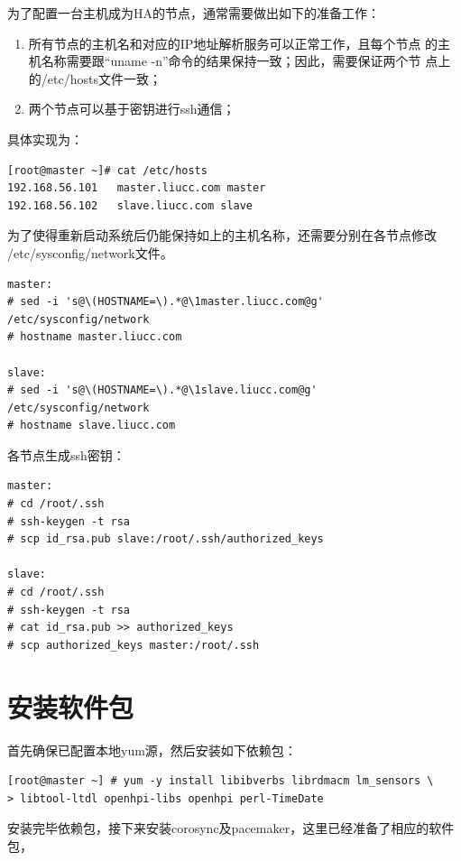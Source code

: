 为了配置一台主机成为HA的节点，通常需要做出如下的准备工作：
\begin{enumerate}[itemsep=0pt,parsep=0pt]
  \item 所有节点的主机名和对应的IP地址解析服务可以正常工作，且每个节点
    的主机名称需要跟“uname -n”命令的结果保持一致；因此，需要保证两个节
    点上的/etc/hosts文件一致；
  \item 两个节点可以基于密钥进行ssh通信；
\end{enumerate}

具体实现为：

\begin{verbatim}
[root@master ~]# cat /etc/hosts
192.168.56.101   master.liucc.com master
192.168.56.102	 slave.liucc.com slave
\end{verbatim}

为了使得重新启动系统后仍能保持如上的主机名称，还需要分别在各节点修改
/etc/sysconfig/network文件。

\begin{verbatim}
master:
# sed -i 's@\(HOSTNAME=\).*@\1master.liucc.com@g'  /etc/sysconfig/network
# hostname master.liucc.com

slave:
# sed -i 's@\(HOSTNAME=\).*@\1slave.liucc.com@g' /etc/sysconfig/network
# hostname slave.liucc.com
\end{verbatim}

各节点生成ssh密钥：

\begin{verbatim}
master:
# cd /root/.ssh
# ssh-keygen -t rsa
# scp id_rsa.pub slave:/root/.ssh/authorized_keys

slave:
# cd /root/.ssh
# ssh-keygen -t rsa
# cat id_rsa.pub >> authorized_keys
# scp authorized_keys master:/root/.ssh
\end{verbatim}

\section{安装软件包}

首先确保已配置本地yum源，然后安装如下依赖包：

\begin{verbatim}
[root@master ~] # yum -y install libibverbs librdmacm lm_sensors \
> libtool-ltdl openhpi-libs openhpi perl-TimeDate
\end{verbatim}

安装完毕依赖包，接下来安装corosync及pacemaker，这里已经准备了相应的软件包，

